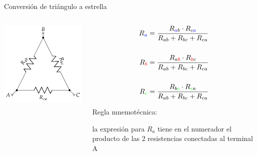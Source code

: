 \documentclass[aspectratio=169, xcolor={usenames,svgnames,dvipsnames}]{beamer}
\begin{document}
\begin{frame}{Conversión de triángulo a estrella}
    \begin{columns}
    \begin{column}{0.3\columnwidth}
    \begin{center}
    \includegraphics[width=.9\linewidth]{../figs/Conexion_Triangulo.pdf}
    \end{center}
    \end{column}
    \begin{column}{0.4\columnwidth}
    \vspace*{8mm}
    \begin{align*}
        R_{\color{blue}a} &= \frac{R_{{\color{blue}a}b} \cdot R_{c{\color{blue}a}}}{R_{ab} + R_{bc} + R_{ca}}\\
        \\    
        R_{\color{red}b} &= \frac{R_{a{\color{red}b}} \cdot R_{{\color{red}b}c}}{R_{ab} + R_{bc} + R_{ca}}\\
        \\
        R_{\color{green}c} &=  \frac{R_{b{\color{green}c}} \cdot R_{{\color{green}c}a}}{R_{ab} + R_{bc} + R_{ca}}
    \end{align*}

    \vspace*{5mm}
    \centering \footnotesize{\alert{Regla mnemotécnica}: 
    
    la expresión para $R_a$ tiene en el numerador el producto de las 2 resistencias conectadas al terminal A}
    \end{column}
    

\end{columns}
\end{frame}
\end{document}
